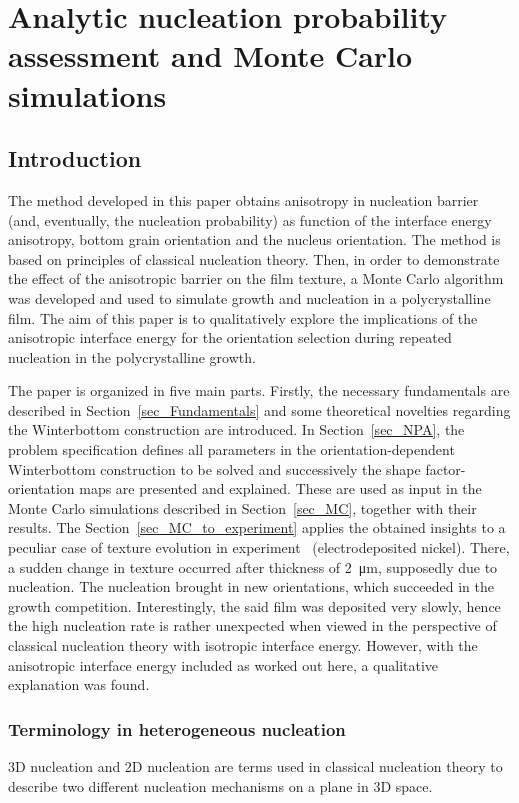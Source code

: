 \chapter{Analytic nucleation probability assessment and Monte Carlo simulations}
\section{Introduction}
\label{sec_Intro}


The method developed in this paper obtains anisotropy in nucleation barrier (and, eventually, the nucleation probability) as function of the interface energy anisotropy, bottom grain orientation and the nucleus orientation. The method is based on principles of classical nucleation theory. Then, in order to demonstrate the effect of the anisotropic barrier on the film texture, a Monte Carlo algorithm was developed and used to simulate growth and nucleation in a polycrystalline film. The aim of this paper is to qualitatively explore the implications of the anisotropic interface energy for the orientation selection during repeated nucleation in the polycrystalline growth. 

The paper is organized in five main parts. Firstly, the necessary fundamentals are described in Section~\ref{sec_Fundamentals} and some theoretical novelties regarding the Winterbottom construction are introduced. In Section~\ref{sec_NPA}, the problem specification defines all parameters in the orientation-dependent Winterbottom construction to be solved and successively the shape factor-orientation maps are presented and explained. These are used as input in the Monte Carlo simulations described in Section~\ref{sec_MC}, together with their results. The Section~\ref{sec_MC_to_experiment} applies the obtained insights to a peculiar case of texture evolution in experiment~\cite{Alimadadi2016} (electrodeposited nickel). There, a sudden change in texture occurred after thickness of \qty{2}{\um}, supposedly due to nucleation. The nucleation brought in new orientations, which succeeded in the growth competition. Interestingly, the said film was deposited very slowly, hence the high nucleation rate is rather unexpected when viewed in the perspective of classical nucleation theory with isotropic interface energy. However, with the anisotropic interface energy included as worked out here, a qualitative explanation was found. 

\subsection{Terminology in heterogeneous nucleation}
3D nucleation and 2D nucleation are terms used in classical nucleation theory to describe two different nucleation mechanisms on a plane in 3D space. 

